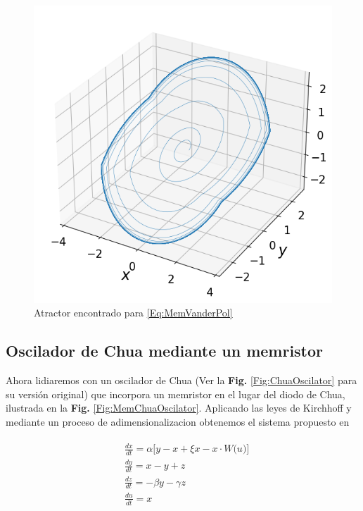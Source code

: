\documentclass[11pt,letterpaper]{article}
\begin{document}
\begin{multicols*}{2}
\begin{figure}[H]
    \centering
    \includegraphics[scale=0.38]{Memristor-basedVanderPolOscillator3D.png}
    \caption{Atractor encontrado para \ref{Eq:MemVanderPol}}
    \label{Fig:MemVanderPol3D}
\end{figure}


\subsection*{Oscilador de Chua mediante un memristor}
Ahora lidiaremos con un oscilador de Chua (Ver la \textbf{Fig.} \ref{Fig:ChuaOscilator} para su versión original) que incorpora un memristor en el lugar del diodo de Chua, ilustrada en la \textbf{Fig.} \ref{Fig:MemChuaOscilator}. Aplicando las leyes de Kirchhoff y mediante un proceso de adimensionalizacion obtenemos el sistema propuesto en \cite{Itoh2008}

\begin{align}
\begin{split}
\label{Eq:MemChuaOscilator}
&\frac{dx}{dt} = \alpha\bigg[y - x +\xi x - x\cdot W\big(u\big)\bigg] \\ 
&\frac{dy}{dt} = x - y + z  \\
&\frac{dz}{dt} = -\beta y -\gamma z  \\
&\frac{du}{dt} = x 
\end{split}
\end{align}


\end{multicols*}
\end{document}
